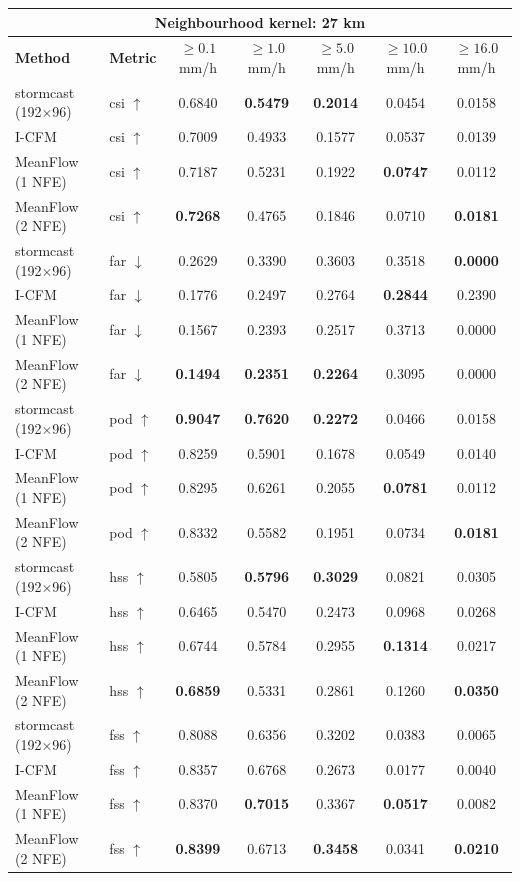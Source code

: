 \documentclass[border=10pt]{standalone}
\begin{document}
\begin{tabular}{llccccc}
\toprule
\multicolumn{7}{c}{\textbf{Neighbourhood kernel: 27 km}} \\
\midrule
\textbf{Method} & \textbf{Metric} & $\geq 0.1$ mm/h & $\geq 1.0$ mm/h & $\geq 5.0$ mm/h & $\geq 10.0$ mm/h & $\geq 16.0$ mm/h \\
\midrule
stormcast (192$\times$96) & csi $\uparrow$ & 0.6840 & \textbf{0.5479} & \textbf{0.2014} & 0.0454 & 0.0158 \\
I-CFM & csi $\uparrow$ & 0.7009 & 0.4933 & 0.1577 & 0.0537 & 0.0139 \\
MeanFlow (1 NFE) & csi $\uparrow$ & 0.7187 & 0.5231 & 0.1922 & \textbf{0.0747} & 0.0112 \\
MeanFlow (2 NFE) & csi $\uparrow$ & \textbf{0.7268} & 0.4765 & 0.1846 & 0.0710 & \textbf{0.0181} \\
\midrule
stormcast (192$\times$96) & far $\downarrow$ & 0.2629 & 0.3390 & 0.3603 & 0.3518 & \textbf{0.0000} \\
I-CFM & far $\downarrow$ & 0.1776 & 0.2497 & 0.2764 & \textbf{0.2844} & 0.2390 \\
MeanFlow (1 NFE) & far $\downarrow$ & 0.1567 & 0.2393 & 0.2517 & 0.3713 & 0.0000 \\
MeanFlow (2 NFE) & far $\downarrow$ & \textbf{0.1494} & \textbf{0.2351} & \textbf{0.2264} & 0.3095 & 0.0000 \\
\midrule
stormcast (192$\times$96) & pod $\uparrow$ & \textbf{0.9047} & \textbf{0.7620} & \textbf{0.2272} & 0.0466 & 0.0158 \\
I-CFM & pod $\uparrow$ & 0.8259 & 0.5901 & 0.1678 & 0.0549 & 0.0140 \\
MeanFlow (1 NFE) & pod $\uparrow$ & 0.8295 & 0.6261 & 0.2055 & \textbf{0.0781} & 0.0112 \\
MeanFlow (2 NFE) & pod $\uparrow$ & 0.8332 & 0.5582 & 0.1951 & 0.0734 & \textbf{0.0181} \\
\midrule
stormcast (192$\times$96) & hss $\uparrow$ & 0.5805 & \textbf{0.5796} & \textbf{0.3029} & 0.0821 & 0.0305 \\
I-CFM & hss $\uparrow$ & 0.6465 & 0.5470 & 0.2473 & 0.0968 & 0.0268 \\
MeanFlow (1 NFE) & hss $\uparrow$ & 0.6744 & 0.5784 & 0.2955 & \textbf{0.1314} & 0.0217 \\
MeanFlow (2 NFE) & hss $\uparrow$ & \textbf{0.6859} & 0.5331 & 0.2861 & 0.1260 & \textbf{0.0350} \\
\midrule
stormcast (192$\times$96) & fss $\uparrow$ & 0.8088 & 0.6356 & 0.3202 & 0.0383 & 0.0065 \\
I-CFM & fss $\uparrow$ & 0.8357 & 0.6768 & 0.2673 & 0.0177 & 0.0040 \\
MeanFlow (1 NFE) & fss $\uparrow$ & 0.8370 & \textbf{0.7015} & 0.3367 & \textbf{0.0517} & 0.0082 \\
MeanFlow (2 NFE) & fss $\uparrow$ & \textbf{0.8399} & 0.6713 & \textbf{0.3458} & 0.0341 & \textbf{0.0210} \\
\bottomrule
\end{tabular}
\end{document}
